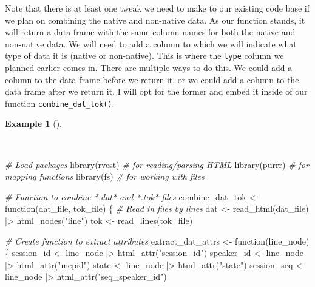 \documentclass[
  letterpaper,
  DIV=11,
  numbers=noendperiod]{scrreport}
\newenvironment{Shaded}{\begin{snugshade}}{\end{snugshade}}
\newcommand{\CommentTok}[1]{\textcolor[rgb]{0.00,0.00,0.00}{\textit{#1}}}
\newcommand{\ControlFlowTok}[1]{\textcolor[rgb]{0.00,0.00,0.00}{#1}}
\newcommand{\FunctionTok}[1]{\textcolor[rgb]{0.00,0.00,0.00}{#1}}
\newcommand{\NormalTok}[1]{\textcolor[rgb]{0.00,0.00,0.00}{#1}}
\newcommand{\OtherTok}[1]{\textcolor[rgb]{0.00,0.00,0.00}{#1}}
\newcommand{\SpecialCharTok}[1]{\textcolor[rgb]{0.00,0.00,0.00}{#1}}
\newcommand{\StringTok}[1]{\textcolor[rgb]{0.00,0.00,0.00}{#1}}
\theoremstyle{definition}
\newtheorem{example}{Example}[chapter]
\theoremstyle{remark}
\begin{document}
Note that there is at least one tweak we need to make to our existing
code base if we plan on combining the native and non-native data. As our
function stands, it will return a data frame with the same column names
for both the native and non-native data. We will need to add a column to
which we will indicate what type of data it is (native or non-native).
This is where the \texttt{type} column we planned earlier comes in.
There are multiple ways to do this. We could add a column to the data
frame before we return it, or we could add a column to the data frame
after we return it. I will opt for the former and embed it inside of our
function \texttt{combine\_dat\_tok()}.

\begin{example}[]\protect\hypertarget{exm-cd-enntt-combine-dat-tok-function}{}\label{exm-cd-enntt-combine-dat-tok-function}

~

\begin{Shaded}
\begin{Highlighting}[]
\CommentTok{\# Load packages}
\FunctionTok{library}\NormalTok{(rvest) }\CommentTok{\# for reading/parsing HTML}
\FunctionTok{library}\NormalTok{(purrr) }\CommentTok{\# for mapping functions}
\FunctionTok{library}\NormalTok{(fs) }\CommentTok{\# for working with files}

\CommentTok{\# Function to combine *.dat* and *.tok* files}
\NormalTok{combine\_dat\_tok }\OtherTok{\textless{}{-}} \ControlFlowTok{function}\NormalTok{(dat\_file, tok\_file) \{}
  \CommentTok{\# Read in files by lines}
\NormalTok{  dat }\OtherTok{\textless{}{-}}
    \FunctionTok{read\_html}\NormalTok{(dat\_file) }\SpecialCharTok{|\textgreater{}}
    \FunctionTok{html\_nodes}\NormalTok{(}\StringTok{"line"}\NormalTok{)}
\NormalTok{  tok }\OtherTok{\textless{}{-}} \FunctionTok{read\_lines}\NormalTok{(tok\_file)}

  \CommentTok{\# Create function to extract attributes}
\NormalTok{  extract\_dat\_attrs }\OtherTok{\textless{}{-}} \ControlFlowTok{function}\NormalTok{(line\_node) \{}
\NormalTok{    session\_id }\OtherTok{\textless{}{-}}\NormalTok{ line\_node }\SpecialCharTok{|\textgreater{}} \FunctionTok{html\_attr}\NormalTok{(}\StringTok{"session\_id"}\NormalTok{)}
\NormalTok{    speaker\_id }\OtherTok{\textless{}{-}}\NormalTok{ line\_node }\SpecialCharTok{|\textgreater{}} \FunctionTok{html\_attr}\NormalTok{(}\StringTok{"mepid"}\NormalTok{)}
\NormalTok{    state }\OtherTok{\textless{}{-}}\NormalTok{ line\_node }\SpecialCharTok{|\textgreater{}} \FunctionTok{html\_attr}\NormalTok{(}\StringTok{"state"}\NormalTok{)}
\NormalTok{    session\_seq }\OtherTok{\textless{}{-}}\NormalTok{ line\_node }\SpecialCharTok{|\textgreater{}} \FunctionTok{html\_attr}\NormalTok{(}\StringTok{"seq\_speaker\_id"}\NormalTok{)}


\end{Highlighting}
\end{Shaded}
\end{example}
\end{document}

